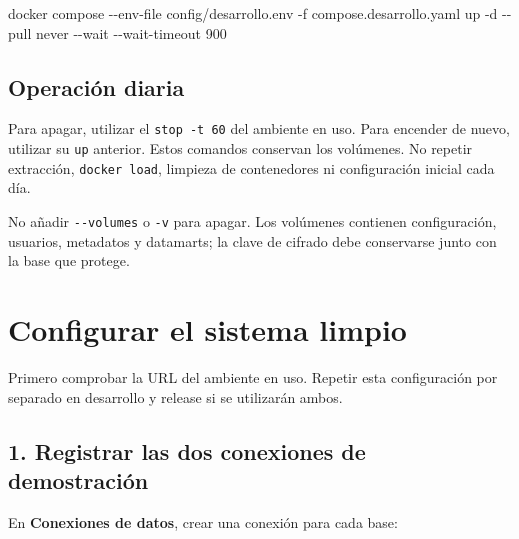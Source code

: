 \documentclass[
  spanish,
  10pt,
  a4paper,
]{article}
\newenvironment{Shaded}{}{}
\newcommand{\AttributeTok}[1]{#1}
\newcommand{\ExtensionTok}[1]{#1}
\newcommand{\NormalTok}[1]{#1}
\renewenvironment{Shaded}{\begin{snugshade}}{\end{snugshade}}%
\begin{document}
\begin{Shaded}
\begin{Highlighting}[]
\ExtensionTok{docker}\NormalTok{ compose }\AttributeTok{{-}{-}env{-}file}\NormalTok{ config/desarrollo.env }\AttributeTok{{-}f}\NormalTok{ compose.desarrollo.yaml up }\AttributeTok{{-}d} \AttributeTok{{-}{-}pull}\NormalTok{ never }\AttributeTok{{-}{-}wait} \AttributeTok{{-}{-}wait{-}timeout}\NormalTok{ 900}
\end{Highlighting}
\end{Shaded}

\subsection{Operación diaria}\label{operaciuxf3n-diaria}

Para apagar, utilizar el \texttt{stop\ -t\ 60} del ambiente en uso. Para
encender de nuevo, utilizar su \texttt{up} anterior. Estos comandos
conservan los volúmenes. No repetir extracción, \texttt{docker\ load},
limpieza de contenedores ni configuración inicial cada día.

No añadir \texttt{-\/-volumes} o \texttt{-v} para apagar. Los volúmenes
contienen configuración, usuarios, metadatos y datamarts; la clave de
cifrado debe conservarse junto con la base que protege.

\clearpage

\section{Configurar el sistema
limpio}\label{configurar-el-sistema-limpio}

Primero comprobar la URL del ambiente en uso. Repetir esta configuración
por separado en desarrollo y release si se utilizarán ambos.

\subsection{1. Registrar las dos conexiones de
demostración}\label{registrar-las-dos-conexiones-de-demostraciuxf3n}

En \textbf{Conexiones de datos}, crear una conexión para cada base:
\end{document}
